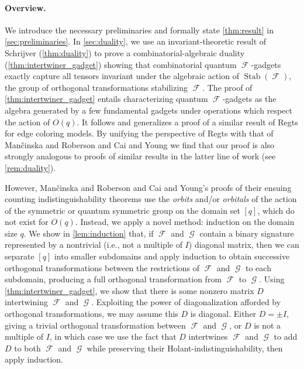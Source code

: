 \documentclass{article}
\theoremstyle{remark}
\theoremstyle{definition}
\DeclareMathOperator{\fc}{\mathcal{F}}
\DeclareMathOperator{\gc}{\mathcal{G}}
\DeclareMathOperator{\stab}{Stab}
\begin{document}
\paragraph{Overview.}
We introduce the necessary preliminaries and formally state \autoref{thm:result} in 
\autoref{sec:preliminaries}. 
In \autoref{sec:duality}, we use an invariant-theoretic
result of Schrijver \cite{schrijver_tensor_2008} (\autoref{thm:duality}) to prove a
combinatorial-algebraic duality (\autoref{thm:intertwiner_gadget}) showing that
combinatorial quantum $\fc$-gadgets exactly capture all tensors invariant under the algebraic
action of $\stab(\fc)$, the group of orthogonal transformations stabilizing $\fc$.
The proof of \autoref{thm:intertwiner_gadget} entails characterizing quantum $\fc$-gadgets as the
algebra generated by a few fundamental gadgets under operations which respect the action of
$O(q)$. It follows and generalizes a proof of a similar result of Regts \cite{regts_rank_2012}
for edge coloring models. By unifying the perspective of Regts with that of
Man\v{c}inska and Roberson and Cai and Young \cite{planar, cai_planar_2023, young2022equality} we find
that our proof is also strongly analogous to proofs of similar results in the latter line of work
(see \autoref{rem:duality}). 

However, Man\v{c}inska and Roberson and Cai and Young's proofs of their ensuing
counting indistinguishability theorems use the \emph{orbits} and/or
\emph{orbitals} of the action of the symmetric or quantum symmetric group on the domain set $[q]$,
which do not exist for $O(q)$. Instead, we apply a novel method: induction on the domain
size $q$. We show in \autoref{lem:induction} that, if $\fc$ and $\gc$ contain a binary signature
represented by a nontrivial (i.e., not a multiple of $I$) diagonal matrix, then we can separate $[q]$
into smaller subdomains and apply induction to obtain successive orthogonal transformations between 
the restrictions of $\fc$ and $\gc$ to each subdomain, producing a full orthogonal transformation from 
$\fc$ to $\gc$. Using \autoref{thm:intertwiner_gadget},
we show that there is some nonzero matrix $D$ intertwining $\fc$
and $\gc$. Exploiting the power of diagonalization afforded by orthogonal transformations, we may
assume this $D$ is diagonal. Either $D = \pm I$, giving a trivial orthogonal transformation between
$\fc$ and $\gc$, or $D$ is not a multiple of $I$, in which case we use the fact that $D$ intertwines
$\fc$ and $\gc$ to add $D$ to both $\fc$ and $\gc$ while preserving their Holant-indistinguishability, 
then apply induction.
\end{document}
